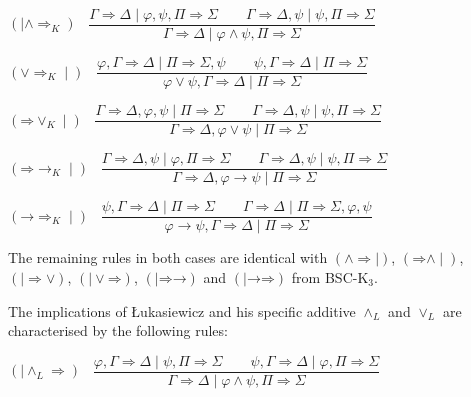 \documentclass[11pt,a4paper,titlepage]{article}
\theoremstyle{definition}
\newcommand{\3}{\vspace{.3in}}
\newcommand{\2}{\vspace{.2in}}
\newcommand{\1}{\vspace{.1in}}
\newcommand{\5}{\vspace{.05in}}
\begin{document}
\1

\noindent$(\mid \mathord{\wedge}\mathord{\Rightarrow_K})$ \ $\dfrac{\Gamma\Rightarrow \Delta \mid \varphi, \psi, \Pi\Rightarrow\Sigma \qquad \Gamma\Rightarrow\Delta, \psi \mid \psi, \Pi\Rightarrow\Sigma}{\Gamma\Rightarrow\Delta \mid \varphi\wedge\psi, \Pi\Rightarrow\Sigma}$ 

\1

\noindent$(\mathord{\vee}\mathord{\Rightarrow_K}\mid)$ \ $\dfrac{\varphi, \Gamma
	\Rightarrow \Delta \mid \Pi\Rightarrow\Sigma, \psi \qquad \psi, \Gamma\Rightarrow\Delta \mid \Pi\Rightarrow\Sigma}{\varphi\vee\psi, \Gamma\Rightarrow\Delta \mid \Pi\Rightarrow\Sigma}$ 

\1

\noindent$(\mathord{\Rightarrow}\mathord{\vee_K}\mid)$ \ $\dfrac{\Gamma\Rightarrow \Delta, \varphi, \psi \mid \Pi\Rightarrow\Sigma \qquad \Gamma\Rightarrow\Delta, \psi \mid \psi, \Pi\Rightarrow\Sigma}{\Gamma\Rightarrow\Delta, \varphi\vee\psi \mid \Pi\Rightarrow\Sigma}$ 

\1

\noindent$(\mathord{\Rightarrow}\mathord{\rightarrow_K}\mid)$ \ $\dfrac{\Gamma
	\Rightarrow \Delta, \psi \mid \varphi, \Pi\Rightarrow\Sigma \qquad \Gamma\Rightarrow\Delta, \psi \mid \psi, \Pi\Rightarrow\Sigma}{\Gamma\Rightarrow\Delta, \varphi\rightarrow\psi \mid \Pi\Rightarrow\Sigma}$ 

\1

\noindent$(\mathord{\rightarrow}\mathord{\Rightarrow_K}\mid)$ \ $\dfrac{\psi, \Gamma\Rightarrow \Delta \mid \Pi\Rightarrow\Sigma \qquad \Gamma\Rightarrow\Delta \mid \Pi\Rightarrow\Sigma, \varphi, \psi}{\varphi\rightarrow\psi, \Gamma\Rightarrow\Delta \mid \Pi\Rightarrow\Sigma}$ 

\1

The remaining rules in both cases are identical with  $(\mathord{\wedge}\mathord{\Rightarrow\mid})$, $(\mathord{\Rightarrow}\mathord{\wedge\mid})$, $(\mathord{\mid\Rightarrow}\mathord{\vee})$, $(\mathord{\mid\vee}\mathord{\Rightarrow})$, $(\mid\mathord{\Rightarrow}\mathord{\rightarrow})$ and $(\mid\mathord{\rightarrow}\mathord{\Rightarrow})$ from BSC-K$_3$.

\1

The implications of \L ukasiewicz \cite{Lukasiewicz} and his specific additive $\wedge_L$ and $\vee_L$ are characterised by the following rules:

\begin{flushleft}
	$(\mid\mathord{\wedge_L\Rightarrow})$ \ $\dfrac{\varphi, \Gamma
		\Rightarrow \Delta \mid \psi, \Pi\Rightarrow\Sigma \qquad \psi, \Gamma\Rightarrow\Delta \mid \varphi, \Pi\Rightarrow\Sigma}{ \Gamma\Rightarrow\Delta \mid \varphi\wedge\psi,\Pi\Rightarrow\Sigma}$
\end{flushleft} 
\end{document}
